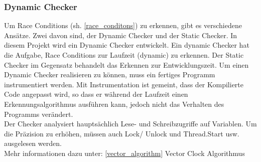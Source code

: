 \documentclass[10pt,a4paper]{article}
\begin{document}
\subsubsection{Dynamic Checker}
\begin{flushleft}
Um Race Conditions (sh. \ref{race_conditons}) zu erkennen, gibt es verschiedene Ansätze. Zwei davon sind, der Dynamic Checker und der Static Checker. In diesem Projekt
wird ein Dynamic Checker entwickelt. Ein dynamic Checker hat die Aufgabe, Race Conditions zur Laufzeit (dynamic) zu erkennen. Der Static Checker
im Gegensatz behandelt das Erkennen zur Entwicklungszeit. Um einen Dynamic Checker realisieren zu können, muss ein fertiges Programm instrumentiert werden.
Mit Instrumentation ist gemeint, dass der Kompilierte Code angepasst wird, so dass er während der Laufzeit einen Erkennungsalgorithmus ausführen kann, jedoch nicht das Verhalten des Programms verändert.\\
Der Checker analysiert hauptsächlich Lese- und Schreibzugriffe auf Variablen. Um die Präzision zu erhöhen, müssen auch Lock/ Unlock und Thread.Start usw. ausgelesen werden.\\
Mehr informationen dazu unter: \ref{vector_algorithm} Vector Clock Algorithmus
\end{flushleft}
\end{document}
